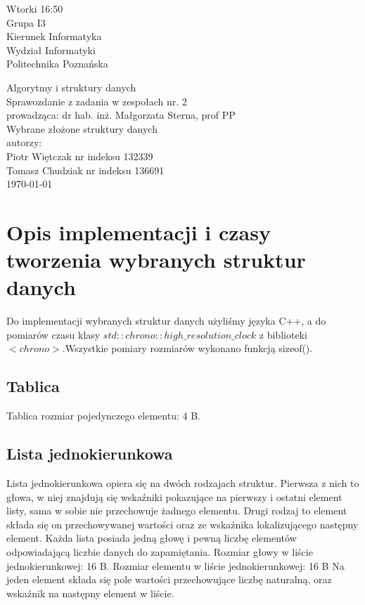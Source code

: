 \documentclass[polish,polish,a4paper]{article}
\begin{document}
	
		\begin{titlepage}
			\begin{flushright}
				{ Wtorki 16:50\\
					Grupa I3\\
					Kierunek Informatyka\\
					Wydział Informatyki\\
					Politechnika Poznańska}
			\end{flushright}
		\vspace*{\fill}
		\begin{center}
			{\Large Algorytmy i struktury danych \\[0.1cm]
				Sprawozdanie z zadania w zespołach nr. 2\\[0.1cm]
				prowadząca: dr hab. inż. Małgorzata Sterna, prof PP}\\
			{\Huge Wybrane złożone struktury danych\\ [0.4cm]}
			{\large autorzy:\\[0.1cm]}
			{\large Piotr Więtczak nr indeksu 132339\\[0.1cm] Tomasz Chudziak nr indeksu 136691}\\[0.5cm]
			\today
		\end{center}
		\vspace*{\fill}
	\end{titlepage}

\section{Opis implementacji i czasy tworzenia wybranych struktur danych}

	
Do implementacji wybranych struktur danych użyliśmy języka C++, a do pomiarów czasu klasy $ std::chrono::high\_resolution\_clock $  z biblioteki $<chrono>$.Wszystkie pomiary rozmiarów wykonano funkcją sizeof().


\subsection*{Tablica}

Tablica rozmiar pojedynczego elementu:
4 B.

\subsection*{Lista jednokierunkowa}

Lista jednokierunkowa opiera się na dwóch rodzajach struktur. Pierwsza z nich to głowa, w niej znajdują się wskaźniki pokazujące na pierwszy i ostatni element listy, sama w sobie nie przechowuje żadnego elementu. Drugi rodzaj to element składa się on przechowywanej wartości oraz ze wskaźnika lokalizującego następny element. Każda lista posiada jedną głowę i pewną liczbę elementów odpowiadającą liczbie danych do zapamiętania.
Rozmiar głowy w liście jednokierunkowej:
16 B.
Rozmiar elementu w liście jednokierunkowej:
16 B
Na jeden element składa się pole wartości przechowujące liczbę naturalną, oraz wskaźnik na następny element w liście.
\end{document}
